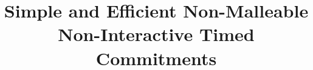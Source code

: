 \documentclass{llncs}
\begin{document}
\title{Simple and Efficient Non-Malleable Non-Interactive Timed Commitments}


\maketitle
%


















\begin{appendix}

%


\end{appendix}
\end{document}
